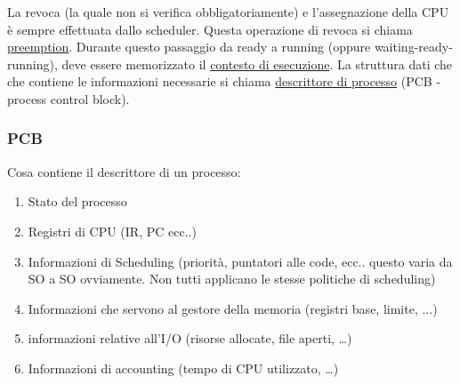 \documentclass{article}
\begin{document}
\noindent La revoca (la quale non si verifica obbligatoriamente) e
l'assegnazione della CPU è sempre effettuata dallo scheduler.
Questa operazione di revoca si chiama \underline{preemption}.
Durante questo passaggio da ready a running 
(oppure waiting-ready-running), deve essere memorizzato il
\underline{contesto di esecuzione}. La struttura dati che che contiene
le informazioni necessarie si chiama
\underline{descrittore di processo}
 (PCB - process control block).


\subsubsection{PCB}
\medskip
\noindent{}
\medskip

\noindent Cosa contiene il descrittore di un processo:
\begin{enumerate}
    \item Stato del processo
    \item Registri di CPU (IR, PC ecc..)
    \item Informazioni di Scheduling (priorità, puntatori alle code, ecc.. questo varia da SO a SO ovviamente. Non tutti applicano le stesse politiche di scheduling)
    \item Informazioni che servono al gestore della memoria (registri base, limite, ...)
    \item informazioni relative all'I/O (risorse allocate, file aperti, …)
    \item Informazioni di accounting (tempo di CPU utilizzato, …)
\end{enumerate}
\end{document}
